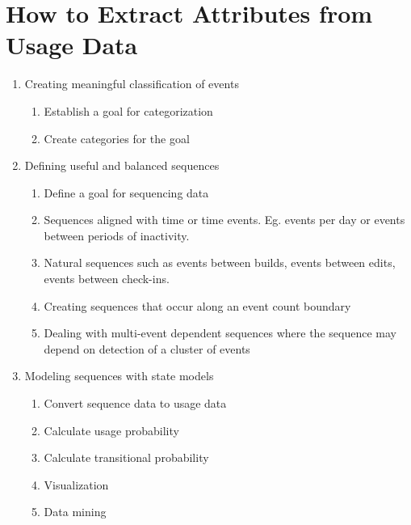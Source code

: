 \section{ How to Extract Attributes from Usage Data}


  \begin{enumerate}
  \item Creating meaningful classification of events
	\begin{enumerate}
	\item
	Establish a goal for categorization
	\item
	Create categories for the goal
	\end{enumerate}
  \item Defining useful and balanced sequences %
	\begin{enumerate}
	\item
	Define a goal for sequencing data
	\item
	Sequences aligned with time or time events.  Eg. events per day or events
	between periods of inactivity.
	\item
	Natural sequences such as events between builds, events between edits, events between check-ins.
	\item
	Creating sequences that occur along an event count boundary
	\item 
	Dealing with multi-event dependent sequences where the sequence may depend on detection of a cluster of events
	\end{enumerate}
  \item  Modeling sequences with state models %
                \begin{enumerate}
                \item Convert sequence data to usage data
                \item Calculate usage probability
                \item Calculate transitional probability
                \item Visualization
                \item Data mining
                \end{enumerate}


  \end{enumerate}